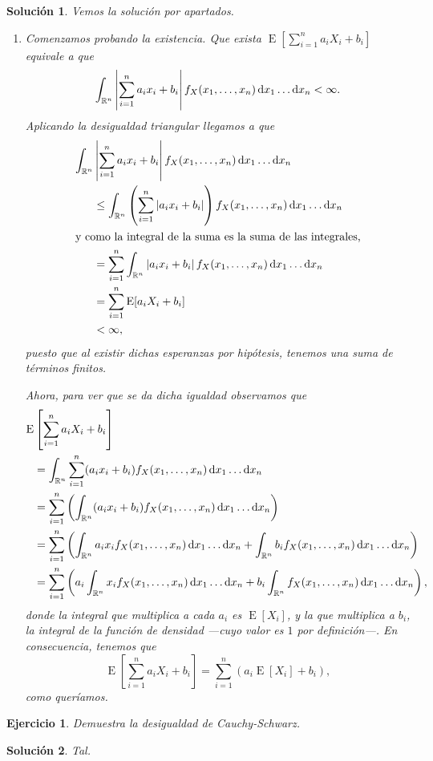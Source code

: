 \documentclass[
  a4paper,
  spanish,
  12pt,
]{scrartcl}
\theoremstyle{ejercicio-style}
\newtheorem{ejer}{Ejercicio}
\theoremstyle{remark-style}
\newtheorem*{sol}{Solución}
\begin{document}
\begin{sol}
  Vemos la solución por apartados. \begin{enumerate}
    \item Comenzamos probando la existencia. Que exista \(\operatorname{E}\left[\sum_{i=1}^n a_iX_i + b_i\right]\) equivale a que \[
      \int_{\mathbb R^n}\left|\sum_{i=1}^n a_ix_i + b_i\right| f_X(x_1, \dots, x_n)\dif x_1\dots\dif x_n < \infty.
    \] Aplicando la desigualdad triangular llegamos a que \begin{align*}
      \int_{\mathbb R^n}&\left|\sum_{i=1}^n a_ix_i + b_i\right| f_X(x_1, \dots, x_n)\dif x_1\dots\dif x_n\\
        &\leq \int_{\mathbb R^n}\left(\sum_{i=1}^n \left|a_ix_i + b_i\right|\right) f_X(x_1, \dots, x_n)\dif x_1\dots\dif x_n\\
        \intertext{y como la integral de la suma es la suma de las integrales,}
        &= \sum_{i=1}^n\int_{\mathbb R^n}\left|a_ix_i + b_i\right| f_X(x_1, \dots, x_n)\dif x_1\dots\dif x_n\\
        &= \sum_{i=1}^n \operatorname{E}[a_iX_i + b_i]\\
        &< \infty,
    \end{align*} puesto que al existir dichas esperanzas por hipótesis, tenemos una suma de términos finitos.

    Ahora, para ver que se da dicha igualdad observamos que \begin{align*}
      \operatorname{E}&\left[\sum_{i=1}^n a_iX_i + b_i\right] \\
        &= \int_{\mathbb R^n}\sum_{i=1}^n (a_ix_i + b_i) f_X(x_1, \dots, x_n)\dif x_1\dots\dif x_n\\
        &= \sum_{i=1}^n\left(\int_{\mathbb R^n} (a_ix_i + b_i) f_X(x_1, \dots, x_n)\dif x_1\dots\dif x_n\right)\\
        &= \sum_{i=1}^n\left(\int_{\mathbb R^n} a_ix_if_X(x_1, \dots, x_n)\dif x_1\dots\dif x_n + \int_{\mathbb R^n} b_if_X(x_1, \dots, x_n)\dif x_1\dots\dif x_n\right)\\
        &= \sum_{i=1}^n\left(a_i\int_{\mathbb R^n}x_if_X(x_1, \dots, x_n)\dif x_1\dots\dif x_n + b_i\int_{\mathbb R^n} f_X(x_1, \dots, x_n)\dif x_1\dots\dif x_n\right),
    \end{align*} donde la integral que multiplica a cada \(a_i\) es \(\operatorname{E}[X_i]\), y la que multiplica a \(b_i\), la integral de la función de densidad ---cuyo valor es \(1\) por definición---. En consecuencia, tenemos que \[
      \operatorname{E}\left[\sum_{i=1}^n a_iX_i + b_i\right] = \sum_{i=1}^n\left(a_i \operatorname{E}[X_i] + b_i\right),
    \] como queríamos.
  \end{enumerate}
\end{sol}

\begin{ejer}
  Demuestra la desigualdad de Cauchy-Schwarz.
\end{ejer}

\begin{sol}
  Tal.
\end{sol}
\end{document}
